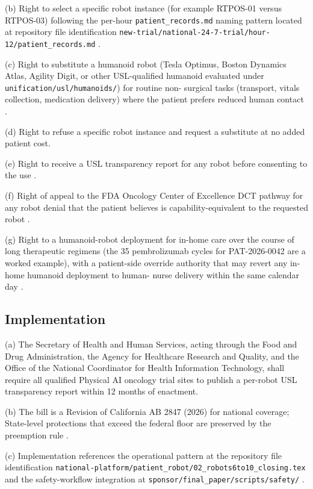 (b) Right to select a specific robot instance (for example RTPOS-01
versus RTPOS-03) following the per-hour
\texttt{patient\_records.md} naming pattern located at repository file identification
\texttt{new-trial/national-24-7-trial/hour-12/patient\_records.md}
\cite{kawchak_2026_19994945}.

(c) Right to substitute a humanoid robot (Tesla Optimus, Boston
Dynamics Atlas, Agility Digit, or other USL-qualified humanoid
evaluated under \texttt{unification/usl/humanoids/}) for routine non-
surgical tasks (transport, vitals collection, medication delivery)
where the patient prefers reduced human contact
\cite{kawchak_2026_18778219}.

(d) Right to refuse a specific robot instance and request a
substitute at no added patient cost.

(e) Right to receive a USL transparency report for any robot before
consenting to the use \cite{kawchak_2026_18778219}.

(f) Right of appeal to the FDA Oncology Center of Excellence DCT
pathway for any robot denial that the patient believes is
capability-equivalent to the requested robot
\cite{fda_oce_advancing_oncology_dct_2024}.

(g) Right to a humanoid-robot deployment for in-home care over the
course of long therapeutic regimens (the 35 pembrolizumab cycles for
PAT-2026-0042 are a worked example), with a patient-side override
authority that may revert any in-home humanoid deployment to human-
nurse delivery within the same calendar day
\cite{kawchak_2026_19119939}.

\subsection{Implementation}

\hspace{0.5cm} (a) The Secretary of Health and Human Services, acting through the
Food and Drug Administration, the Agency for Healthcare Research and
Quality, and the Office of the National Coordinator for Health
Information Technology, shall require all qualified Physical AI
oncology trial sites to publish a per-robot USL transparency report
within 12 months of enactment.

(b) The bill is a Revision of California AB 2847 (2026) for national
coverage; State-level protections that exceed the federal floor are
preserved by the preemption rule
\cite{kawchak_2026_19176370}.

(c) Implementation references the operational pattern at the repository file identification
\texttt{national-platform/patient\_robot/02\_robots6to10\_closing.tex}
and the safety-workflow integration at
\texttt{sponsor/final\_paper/scripts/safety/}
\cite{kawchak_2026_19244918, kawchak_2026_19396256}.

